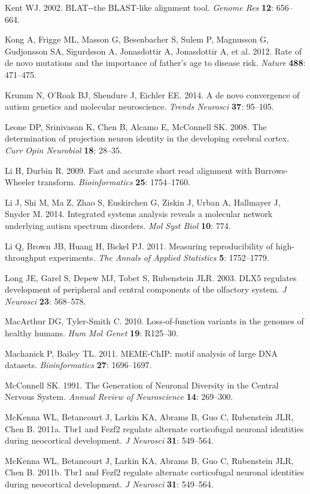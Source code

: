 \documentclass[]{article}
\begin{document}
Kent WJ. 2002. BLAT-\/-the BLAST-like alignment tool. \emph{Genome Res}
\textbf{12}: 656--664.

Kong A, Frigge ML, Masson G, Besenbacher S, Sulem P, Magnusson G,
Gudjonsson SA, Sigurdsson A, Jonasdottir A, Jonasdottir A, et al. 2012.
Rate of de novo mutations and the importance of father's age to disease
risk. \emph{Nature} \textbf{488}: 471--475.

Krumm N, O'Roak BJ, Shendure J, Eichler EE. 2014. A de novo convergence
of autism genetics and molecular neuroscience. \emph{Trends Neurosci}
\textbf{37}: 95--105.

Leone DP, Srinivasan K, Chen B, Alcamo E, McConnell SK. 2008. The
determination of projection neuron identity in the developing cerebral
cortex. \emph{Curr Opin Neurobiol} \textbf{18}: 28--35.

Li H, Durbin R. 2009. Fast and accurate short read alignment with
Burrows-Wheeler transform. \emph{Bioinformatics} \textbf{25}:
1754--1760.

Li J, Shi M, Ma Z, Zhao S, Euskirchen G, Ziskin J, Urban A, Hallmayer J,
Snyder M. 2014. Integrated systems analysis reveals a molecular network
underlying autism spectrum disorders. \emph{Mol Syst Biol} \textbf{10}:
774.

Li Q, Brown JB, Huang H, Bickel PJ. 2011. Measuring reproducibility of
high-throughput experiments. \emph{The Annals of Applied Statistics}
\textbf{5}: 1752--1779.

Long JE, Garel S, Depew MJ, Tobet S, Rubenstein JLR. 2003. DLX5
regulates development of peripheral and central components of the
olfactory system. \emph{J Neurosci} \textbf{23}: 568--578.

MacArthur DG, Tyler-Smith C. 2010. Loss-of-function variants in the
genomes of healthy humans. \emph{Hum Mol Genet} \textbf{19}: R125--30.

Machanick P, Bailey TL. 2011. MEME-ChIP: motif analysis of large DNA
datasets. \emph{Bioinformatics} \textbf{27}: 1696--1697.

McConnell SK. 1991. The Generation of Neuronal Diversity in the Central
Nervous System. \emph{Annual Review of Neuroscience} \textbf{14}:
269--300.

McKenna WL, Betancourt J, Larkin KA, Abrams B, Guo C, Rubenstein JLR,
Chen B. 2011a. Tbr1 and Fezf2 regulate alternate corticofugal neuronal
identities during neocortical development. \emph{J Neurosci}
\textbf{31}: 549--564.

McKenna WL, Betancourt J, Larkin KA, Abrams B, Guo C, Rubenstein JLR,
Chen B. 2011b. Tbr1 and Fezf2 regulate alternate corticofugal neuronal
identities during neocortical development. \emph{J Neurosci}
\textbf{31}: 549--564.
\end{document}
